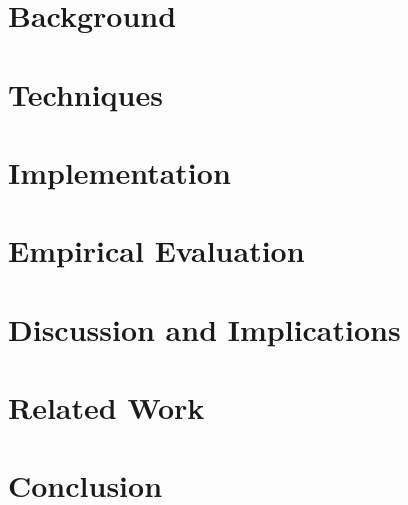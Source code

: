 

\clearpage

\chapter{Background}
\label{ch:background}




\chapter{Techniques}
\label{ch:techniques}




\chapter{Implementation}
\label{ch:Implementation}


%
\chapter{Empirical Evaluation}
\label{ch:evaluation}



\chapter{Discussion and Implications}
\label{ch:discussion}



\chapter{Related Work}
\label{ch:related-work}



\chapter{Conclusion}
\label{ch:conclusion}

